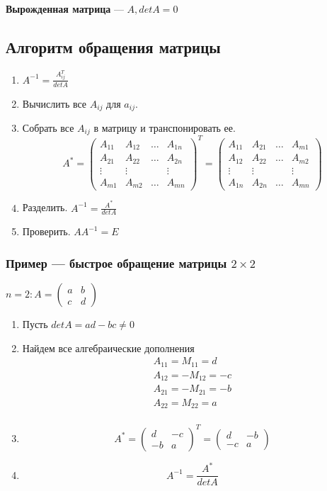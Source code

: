 \documentclass{article}
\begin{document}
\textbf{Вырожденная матрица} --- $A, det A = 0$

\subsection{Алгоритм обращения матрицы}

\begin{enumerate}
	\item $A^{-1} = \frac{A_{ij}^T}{det A}$
	\item Вычислить все $A_{ij}$ для $a_{ij}$.
	\item Собрать все $A_{ij}$ в матрицу и транспонировать ее.
	\[
	A^* = \begin{pmatrix}
		A_{11} & A_{12} & \dots & A_{1n} \\
		A_{21} & A_{22} & \dots & A_{2n} \\
		\vdots & \vdots & & \vdots \\
		A_{m1} & A_{m2} & \dots & A_{mn}
	\end{pmatrix}^T =
	\begin{pmatrix}
		A_{11} & A_{21} & \dots & A_{m1} \\
		A_{12} & A_{22} & \dots & A_{m2} \\
		\vdots & \vdots & & \vdots \\
		A_{1n} & A_{2n} & \dots & A_{mn}
	\end{pmatrix}
	\]
	\item Разделить. $A^{-1} = \frac{A^*}{det A}$
	\item Проверить. $A A^{-1} = E$
\end{enumerate}

\subsubsection{Пример --- быстрое обращение матрицы $2 \times 2$}

$
n = 2 : A = \begin{pmatrix}
	a & b \\
	c & d
\end{pmatrix}
$
\begin{enumerate}
	\item Пусть $det A = ad - bc \ne 0$
	\item Найдем все алгебраические дополнения 
	\begin{gather*}
		A_{11} = M_{11} = d \\
		A_{12} = -M_{12} = -c \\
		A_{21} = -M_{21} = -b \\
		A_{22} = M_{22} = a \\
	\end{gather*}
	\item \[ A^* = \begin{pmatrix}
		d & -c \\
		-b & a
	\end{pmatrix}^T =
	\begin{pmatrix}
		d & -b \\
		-c & a
	\end{pmatrix} \]
	\item \[ A^{-1} = \frac{A^*}{det A} \]
\end{enumerate}
\end{document}
